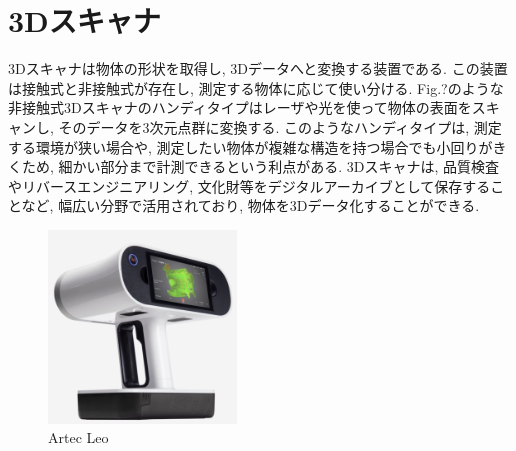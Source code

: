 \section{3Dスキャナ}
3Dスキャナは物体の形状を取得し, 3Dデータへと変換する装置である.
この装置は接触式と非接触式が存在し, 測定する物体に応じて使い分ける.
Fig.?のような非接触式3Dスキャナのハンディタイプはレーザや光を使って物体の表面をスキャンし, そのデータを3次元点群に変換する.
このようなハンディタイプは, 測定する環境が狭い場合や, 測定したい物体が複雑な構造を持つ場合でも小回りがきくため, 細かい部分まで計測できるという利点がある.
3Dスキャナは, 品質検査やリバースエンジニアリング, 文化財等をデジタルアーカイブとして保存することなど, 幅広い分野で活用されており, 物体を3Dデータ化することができる.

\vspace{5mm}
\begin{figure}[H]
     \centering
     \includegraphics[width=50mm]{images/png/artecleo.png}
     \caption{Artec Leo}
     \label{Fig:artecleo}
   \end{figure}